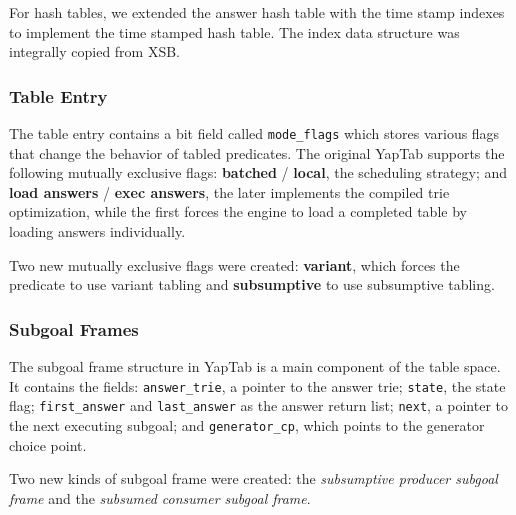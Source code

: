 For hash tables, we extended the answer hash table with
the time stamp indexes to implement the time stamped hash table.
The index data structure was integrally copied from XSB.

\subsubsection{Table Entry}

The table entry contains a bit field called \texttt{mode\_flags} which stores various flags
that change the behavior of tabled predicates. The original YapTab supports the
following mutually exclusive flags: \textbf{batched} / \textbf{local}, the scheduling strategy;
and \textbf{load answers} / \textbf{exec answers}, the later implements the compiled trie optimization, while the first forces the engine to load a completed table by loading answers individually.

Two new mutually exclusive flags were created: \textbf{variant}, which forces the predicate to use variant
tabling and \textbf{subsumptive} to use subsumptive tabling.

\subsubsection{Subgoal Frames}

The subgoal frame structure in YapTab is a main component of the table space.
It contains the fields: \texttt{answer\_trie}, a pointer to the answer trie;
\texttt{state}, the state flag; \texttt{first\_answer} and \texttt{last\_answer}
as the answer return list; \texttt{next}, a pointer to the next executing subgoal;
and \texttt{generator\_cp}, which points to the generator choice point.

Two new kinds of subgoal frame were created: the
\textit{subsumptive producer subgoal frame} and
the \textit{subsumed consumer subgoal frame}.

